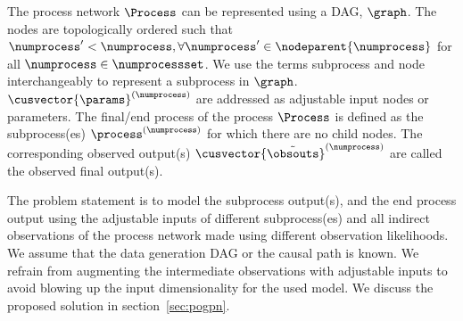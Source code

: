 The process network $\Process$ can be represented using a DAG, $\graph$. The nodes are topologically ordered such that $\numprocess'<\numprocess ,\forall \numprocess' \in \nodeparent{\numprocess}$ for all $\numprocess\in\numprocessset$. We use the terms subprocess and node interchangeably to represent a subprocess in $\graph$. $\cusvector{\params}^{(\numprocess)}$ are addressed as adjustable input nodes or parameters. The final/end process of the process $\Process$ is defined as the subprocess(es) $\process^{(\numprocess)}$ for which there are no child nodes. The corresponding observed output(s) $\cusvector{\tilde{\obsouts}}^{(\numprocess)}$ are called the observed final output(s).

The problem statement is to model the subprocess output(s), and the end process output using the adjustable inputs of different subprocess(es) and all indirect observations of the process network made using different observation likelihoods. We assume that the data generation DAG or the causal path is known. We refrain from augmenting the intermediate observations with adjustable inputs to avoid blowing up the input dimensionality for the used model. We discuss the proposed solution in section~\ref{sec:pogpn}.
